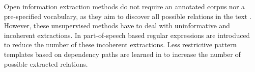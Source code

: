 Open information extraction methods do not require an annotated corpus nor a pre-specified vocabulary, as they aim to discover all possible relations in the text \citep{Bankoetal2007}.
However, these unsupervised methods have to deal with uninformative and incoherent extractions. In \citep{Fader2011} part-of-speech based regular expressions are introduced to reduce the number of these incoherent extractions. Less restrictive pattern templates based on dependency paths are learned in \citep{Mausam2012} to increase the number of possible extracted relations.
